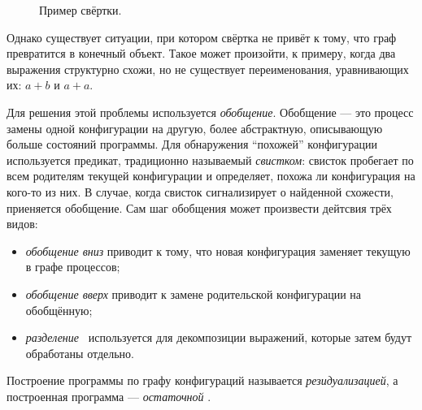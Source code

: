 \begin{figure}[h!]
\center
{}

\label{fig:pgraphFoldingExample}
\caption{Пример свёртки.}
\end{figure}

Однако существует ситуации, при котором свёртка не привёт к тому, что граф превратится в
конечный объект. Такое может произойти, к примеру, когда два выражения структурно
схожи, но не существует переименования, уравнивающих их: $a + b$ и $a + a$.

Для решения этой проблемы используется \emph{обобщение}\cite{scGen}. Обобщение --- это процесс
замены одной конфигурации на другую, более абстрактную, описывающую больше состояний
программы. Для обнаружения ``похожей'' конфигурации используется предикат,
традиционно называемый \emph{свистком}: свисток пробегает по всем
родителям текущей конфигурации и определяет, похожа ли конфигурация на кого-то из них.
В случае, когда свисток сигнализирует о найденной схожести, приеняется обобщение.
Сам шаг обобщения может произвести дейтсвия трёх видов:
\begin{itemize}
\item \emph{обобщение вниз} приводит к тому, что новая конфигурация заменяет текущую в графе процессов;
\item \emph{обобщение вверх} приводит к замене родительской конфигурации на обобщённую;
\item \emph{разделение}~ используется для декомпозиции выражений, которые затем
будут обработаны отдельно.
\end{itemize}


Построение программы по графу конфигураций называется \emph{резидуализацией}, а
построенная программа --- \emph{остаточной} .

